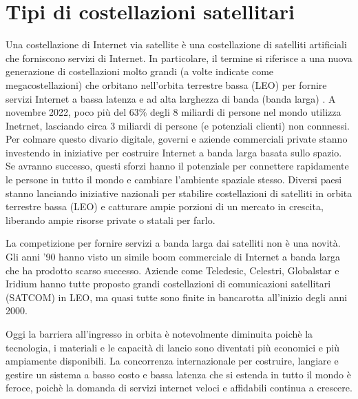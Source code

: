 
\chapter{Tipi di costellazioni satellitari}
\label{chp:intro}

Una costellazione di Internet via satellite è una costellazione di satelliti artificiali che forniscono servizi di Internet. In particolare, il termine si riferisce a una nuova generazione di costellazioni molto grandi (a volte indicate come megacostellazioni) che orbitano nell'orbita terrestre bassa (LEO) per fornire servizi Internet a bassa latenza e ad alta larghezza di banda (banda larga) \cite{jose_del_rosario_nsr_2018}.
A novembre 2022, poco più del 63\% degli 8 miliardi di persone nel mondo utilizza Inetrnet, lasciando circa 3 miliardi di persone (e potenziali clienti) non connnessi.
Per colmare questo divario digitale, governi e aziende commerciali private stanno investendo in iniziative per costruire Internet a banda larga basata sullo spazio.
Se avranno successo, questi sforzi hanno il potenziale per connettere rapidamente le persone in tutto il mondo e cambiare l'ambiente spaziale stesso.
Diversi paesi stanno lanciando iniziative nazionali per stabilire costellazioni di satelliti in orbita terrestre bassa (\ac{LEO}) e catturare ampie porzioni di un mercato in crescita, liberando ampie risorse private o statali per farlo.

La competizione per fornire servizi a banda larga dai satelliti non è una novità.
Gli anni '90 hanno visto un simile boom commerciale di Internet a banda larga che ha prodotto scarso successo.
Aziende come Teledesic, Celestri, Globalstar e Iridium hanno tutte proposto grandi costellazioni di comunicazioni satellitari (SATCOM) in \ac{LEO}, ma quasi tutte sono finite in bancarotta all'inizio degli anni 2000.

Oggi la barriera all'ingresso in orbita è notevolmente diminuita poichè la tecnologia, i materiali e le capacità di lancio sono diventati più economici e più ampiamente disponibili.
La concorrenza internazionale per costruire, langiare e gestire un sistema a basso costo e bassa latenza che si estenda in tutto il mondo è feroce, poichè la domanda di servizi internet veloci e affidabili continua a crescere.

